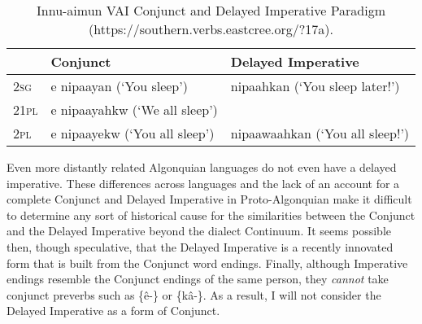 \begin{table}
  \centering
  \footnotesize
  \begin{tabular}{lll}
    \toprule
     & Conjunct & Delayed Imperative           \\
    \midrule
2\textsc{sg}  & e nipaayan  (`You sleep')     & nipaahkan  (`You sleep later!') \\
21\textsc{pl} & e nipaayahkw (`We all sleep') &    \\
2\textsc{pl}  & e nipaayekw  (`You all sleep')  & nipaawaahkan  (`You all sleep!')\\
    \bottomrule
  \end{tabular}
  \caption{
    Innu-aimun VAI Conjunct and Delayed Imperative Paradigm (https://southern.verbs.eastcree.org/?17a).\label{tab:eastcree}
  }
\end{table}
 
 Even more distantly related Algonquian languages do not even have a delayed imperative. These differences across languages and the lack of an account for a complete Conjunct and Delayed Imperative in Proto-Algonquian make it difficult to determine any sort of historical cause for the similarities between the Conjunct and the Delayed Imperative beyond the dialect Continuum. It seems possible then, though speculative, that the Delayed Imperative is a recently innovated form that is built from the Conjunct word endings. Finally, although Imperative endings resemble the Conjunct endings of the same person, they \textit{cannot} take conjunct preverbs such as \{ê-\} or \{kâ-\}. As a result, I will not consider the Delayed Imperative as a form of Conjunct. 